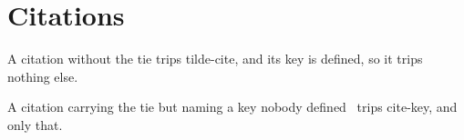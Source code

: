 \section{Citations}
\label{sec:ch01-citations}

A citation without the tie \autocite{realkey} trips tilde-cite, and its key is
defined, so it trips nothing else.

A citation carrying the tie but naming a key nobody
defined~\autocite{missingkey} trips cite-key, and only that.
